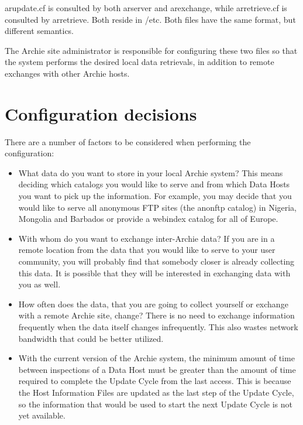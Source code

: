 arupdate.cf is consulted by both arserver and arexchange, while arretrieve.cf
is consulted by arretrieve. Both reside in \archie/etc. Both files have the
same format, but different semantics.









The Archie site administrator is responsible for configuring these two files
so that the system performs the desired local data retrievals, in addition to
remote exchanges with other Archie hosts.


\section{Configuration decisions}

There are a number of factors to be considered when performing the configuration:

\begin{itemize}

\item What data do you want to store in your local Archie system? This
means deciding which catalogs you would like to serve and from which Data
Hosts you want to pick up the information. For example, you may decide that
you would like to serve all anonymous FTP sites (the anonftp catalog) in
Nigeria, Mongolia and Barbados or provide a webindex catalog for all of
Europe.

\item With whom do you want to exchange inter-Archie data? If you are in a remote location from the data that you would like to serve to your user community, you will probably find that somebody closer is already collecting this data. It is possible that they will be interested in exchanging data with you as well.

\item How often does the data, that you are going to collect yourself or
exchange with a remote Archie site, change? There is no need to exchange
information frequently when the data itself changes infrequently. This also
wastes network bandwidth that could be better utilized.

\item With the current version of the Archie system, the minimum amount of
time between inspections of a Data Host must be greater than the amount of
time required to complete the Update Cycle from the last access. This is
because the Host Information Files are updated as the last step of the Update
Cycle, so the information that would be used to start the next Update Cycle is
not yet available.
\end{itemize}

